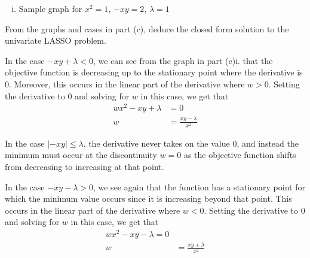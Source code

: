 \begin{Parts}
\begin{solution}
\begin{enumerate}[i.]
        \item Sample graph for $x^{2} = 1$, $-xy = 2$, $\lambda = 1$

    \end{enumerate}
\end{solution}

\Part From the graphs and cases in part (c), deduce the closed form solution to
the univariate LASSO problem.

\begin{solution}
    In the case $-xy + \lambda < 0$, we can see from the graph in part (c)i.
    that the objective function is decreasing up to the stationary point where the derivative
    is 0. Moreover, this occurs in the linear part of the derivative where $w >
    0$. Setting the derivative to $0$ and solving for $w$ in this case, we get that
    \begin{align*}
        wx^{2} - xy + \lambda &= 0 \\
        w &= \frac{xy - \lambda}{x^{2}}
    \end{align*}

    In the case $|-xy| \leq \lambda$, the derivative never takes on the value
    $0$, and instead the minimum must occur at the discontinuity $w = 0$ as the
    objective function shifts from decreasing to increasing at that point.

    In the case $-xy - \lambda > 0$, we see again that the function has a
    stationary point for which the minimum value occurs since it is increasing
    beyond that point. This occurs in the linear part of the derivative where
    $w < 0$. Setting the derivative to $0$ and solving for $w$ in this case, we
    get that
    \begin{align*}
        wx^{2} - xy - \lambda = 0 \\
        w &= \frac{xy + \lambda}{x^{2}}
    \end{align*}


\end{solution}
\end{Parts}
